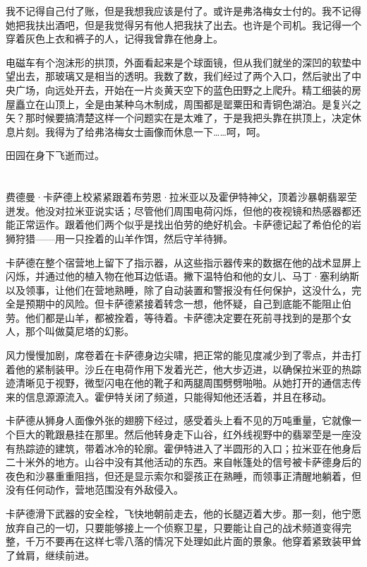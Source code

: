 \documentclass[AutoFakeBold=true]{book}
\begin{document}
我不记得自己付了账，但是我想我应该是付了。或许是弗洛梅女士付的。我不记得她把我扶出酒吧，但是我觉得另有他人把我扶了出去。也许是个司机。我记得一个穿着灰色上衣和裤子的人，记得我曾靠在他身上。

电磁车有个泡沫形的拱顶，外面看起来是个球面镜，但从我们就坐的深凹的软垫中望出去，那玻璃又是相当的透明。我数了数，我们经过了两个入口，然后驶出了中央广场，向远处开去，开始在一片炎黄天空下的蓝色田野之上爬升。精工细装的房屋矗立在山顶上，全是由某种乌木制成，周围都是罂粟田和青铜色湖泊。是复兴之矢？那时候要搞清楚这样一个问题实在是太难了，于是我把头靠在拱顶上，决定休息片刻。我得为了给弗洛梅女士画像而休息一下……呵，呵。

田园在身下飞逝而过。

\chapter{}

费德曼·卡萨德上校紧紧跟着布劳恩·拉米亚以及霍伊特神父，顶着沙暴朝翡翠茔迸发。他没对拉米亚说实话；尽管他们周围电荷闪烁，但他的夜视镜和热感器都还能正常运作。跟着他们两个似乎是找出伯劳的绝好机会。卡萨德记起了希伯伦的岩狮狩猎——用一只拴着的山羊作饵，然后守羊待狮。

卡萨德在整个宿营地上留下了指示器，从这些指示器传来的数据在他的战术显屏上闪烁，并通过他的植入物在他耳边低语。撇下温特伯和他的女儿、马丁·塞利纳斯以及领事，让他们在营地熟睡，除了自动装置和警报没有任何保护，这没什么，完全是预期中的风险。但卡萨德紧接着转念一想，他怀疑，自己到底能不能阻止伯劳。他们都是山羊，都被拴着，等待着。卡萨德决定要在死前寻找到的是那个女人，那个叫做莫尼塔的幻影。

风力慢慢加剧，席卷着在卡萨德身边尖啸，把正常的能见度减少到了零点，并击打着他的紧制装甲。沙丘在电荷作用下发着光芒，他大步迈进，以确保拉米亚的热踪迹清晰见于视野，微型闪电在他的靴子和两腿周围劈劈啪啪。从她打开的通信志传来的信息源源流入。霍伊特关闭了频道，只能得知他还活着，并且在移动。

卡萨德从狮身人面像外张的翅膀下经过，感受着头上看不见的万吨重量，它就像一个巨大的靴跟悬挂在那里。然后他转身走下山谷，红外线视野中的翡翠茔是一座没有热踪迹的建筑，带着冰冷的轮廓。霍伊特进入了半圆形的入口；拉米亚在他身后二十米外的地方。山谷中没有其他活动的东西。来自帐篷处的信号被卡萨德身后的夜色和沙暴重重阻挡，但还是显示索尔和婴孩正在熟睡，而领事正清醒地躺着，但没有任何动作，营地范围没有外敌侵入。

卡萨德滑下武器的安全栓，飞快地朝前走去，他的长腿迈着大步。那一刻，他宁愿放弃自己的一切，只要能够接上一个侦察卫星，只要能让自己的战术频道变得完整，千万不要再在这样七零八落的情况下处理如此片面的景象。他穿着紧致装甲耸了耸肩，继续前进。
\end{document}
